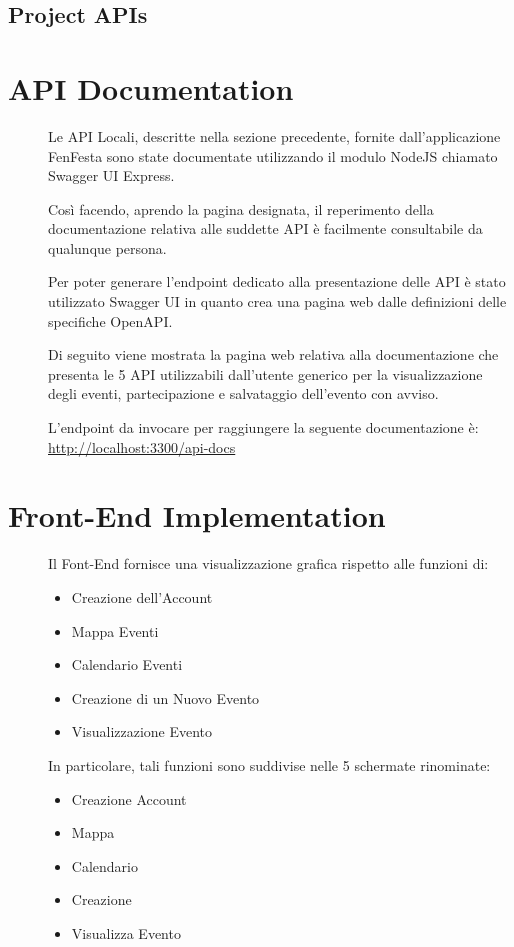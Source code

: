 \documentclass{article}
\begin{document}
\subsection{Project APIs}
\begin{description}
    \item[]
\end{description}
\clearpage
\section{API Documentation}
\begin{description}
    \item[] Le API Locali, descritte nella sezione precedente, fornite dall'applicazione FenFesta sono state documentate utilizzando il modulo NodeJS chiamato Swagger UI Express.
    \item[] Così facendo, aprendo la pagina designata, il reperimento della documentazione relativa alle suddette API è facilmente consultabile da qualunque persona.
    \item[] Per poter generare l'endpoint dedicato alla presentazione delle API è stato utilizzato Swagger UI in quanto crea una pagina web dalle definizioni delle specifiche OpenAPI.
    \item[] Di seguito viene mostrata la pagina web relativa alla documentazione che presenta le 5 API utilizzabili dall'utente generico per la visualizzazione degli eventi, partecipazione e salvataggio dell'evento con avviso.
    \item[] L'endpoint da invocare per raggiungere la seguente documentazione è: \url{http://localhost:3300/api-docs}
\end{description}
\clearpage
\section{Front-End Implementation}
\begin{description}
    \item[] Il Font-End fornisce una visualizzazione grafica rispetto alle funzioni di:
        \begin{itemize}
            \item Creazione dell'Account
            \item Mappa Eventi
            \item Calendario Eventi
            \item Creazione di un Nuovo Evento
            \item Visualizzazione Evento
        \end{itemize}
    \item[] In particolare, tali funzioni sono suddivise nelle 5 schermate rinominate:
        \begin{itemize}
            \item Creazione Account
            \item Mappa
            \item Calendario
            \item Creazione
            \item Visualizza Evento
        \end{itemize}
\end{description}
\clearpage
\end{document}
